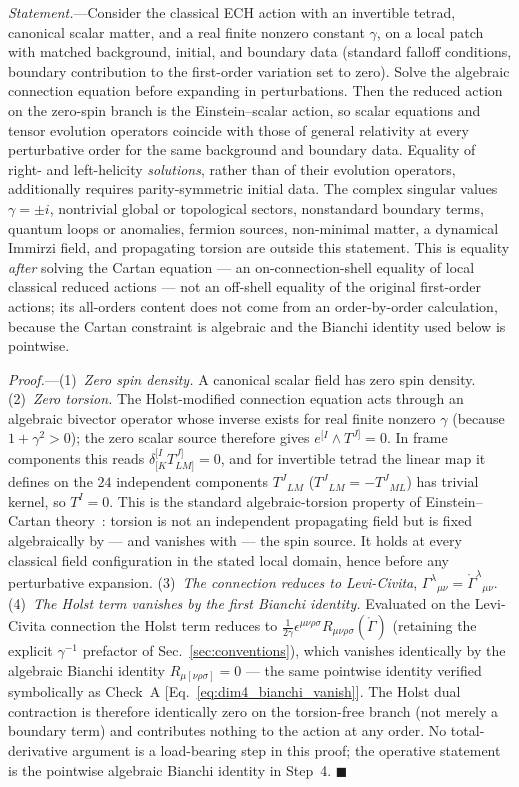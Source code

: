 \documentclass[aps,prd,twocolumn,superscriptaddress,showpacs,preprintnumbers,nofootinbib,longbibliography,floatfix]{revtex4-2}
\begin{document}
\emph{Statement.}---Consider the classical ECH action with an invertible
tetrad, canonical scalar matter, and a real finite nonzero constant
$\gamma$, on a local patch with matched background, initial, and
boundary data (standard falloff conditions, boundary contribution to the
first-order variation set to zero). Solve the algebraic connection
equation before expanding in perturbations. Then the reduced action on
the zero-spin branch is the Einstein--scalar action, so scalar equations
and tensor evolution operators coincide with those of general relativity
at every perturbative order for the same background and boundary data.
Equality of right- and left-helicity \emph{solutions}, rather than of
their evolution operators, additionally requires parity-symmetric
initial data. The complex singular values $\gamma=\pm i$, nontrivial
global or topological sectors, nonstandard boundary terms, quantum loops
or anomalies, fermion sources, non-minimal matter, a dynamical Immirzi
field, and propagating torsion are outside this statement. This is
equality \emph{after} solving the Cartan equation --- an
on-connection-shell equality of local classical reduced actions --- not
an off-shell equality of the original first-order actions; its
all-orders content does not come from an order-by-order calculation,
because the Cartan constraint is algebraic and the Bianchi identity used
below is pointwise.

\emph{Proof.}---(1)~\emph{Zero spin density.} A canonical scalar field
has zero spin density. (2)~\emph{Zero torsion.} The Holst-modified
connection equation acts through an algebraic bivector operator whose
inverse exists for real finite nonzero $\gamma$ (because
$1+\gamma^2>0$); the zero scalar source therefore gives
$e^{[I}\wedge T^{J]}=0$. In frame components this reads
$\delta^{[I}_{[K}T^{J]}_{LM]}=0$, and for invertible tetrad the linear
map it defines on the $24$ independent components $T^J{}_{LM}$
($T^J{}_{LM}=-T^J{}_{ML}$) has trivial kernel, so $T^I=0$. This is the
standard algebraic-torsion property of Einstein--Cartan
theory~\cite{Hehl1976}: torsion is not an independent propagating field
but is fixed algebraically by --- and vanishes with --- the spin source.
It holds at every classical field configuration in the stated
local domain, hence before any perturbative expansion. (3)~\emph{The
connection reduces to Levi-Civita},
$\Gamma^\lambda{}_{\mu\nu}=\mathring\Gamma^\lambda{}_{\mu\nu}$.
(4)~\emph{The Holst term vanishes by the first Bianchi identity.}
Evaluated on the Levi-Civita connection the Holst term reduces to
$\tfrac{1}{2\gamma}\epsilon^{\mu\nu\rho\sigma}R_{\mu\nu\rho\sigma}(\mathring\Gamma)$
(retaining the explicit $\gamma^{-1}$ prefactor of
Sec.~\ref{sec:conventions}),
which vanishes identically by the algebraic Bianchi identity
$R_{\mu[\nu\rho\sigma]}=0$ --- the same pointwise identity verified
symbolically as Check~A [Eq.~\eqref{eq:dim4_bianchi_vanish}]. The Holst
dual contraction is therefore identically zero on the torsion-free
branch (not merely a boundary term) and contributes nothing to the
action at any order. No total-derivative argument is a load-bearing step
in this proof; the operative statement is the pointwise algebraic
Bianchi identity in Step~4. $\blacksquare$
\end{document}
